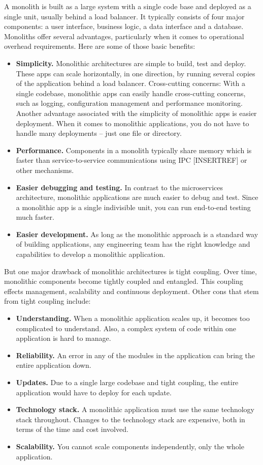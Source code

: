 A monolith is built as a large system with a single code base and deployed as a single unit, usually behind a load balancer.
It typically consists of four major components: a user interface, business logic, a data interface and a database.
Monoliths offer several advantages, particularly when it comes to operational overhead requirements.
Here are some of those basic benefits:

\begin{itemize}
    \item \textbf{Simplicity.} Monolithic architectures are simple to build, test and deploy.
    These apps can scale horizontally, in one direction, by running several copies of the application behind a load balancer.
    Cross-cutting concerns: With a single codebase, monolithic apps can easily handle cross-cutting concerns, such as logging,
    configuration management and performance monitoring.
    Another advantage associated with the simplicity of monolithic apps is easier deployment.
    When it comes to monolithic applications, you do not have to handle many deployments – just one file or directory.
    \item \textbf{Performance.} Components in a monolith typically share memory which is faster than service-to-service communications using
    IPC [INSERTREF] or other mechanisms.
    \item \textbf{Easier debugging and testing.}
    In contrast to the microservices architecture, monolithic applications are much easier to debug and test.
    Since a monolithic app is a single indivisible unit, you can run end-to-end testing much faster.
    \item \textbf{Easier development.} As long as the monolithic approach is a standard way of building applications,
    any engineering team has the right knowledge and capabilities to develop a monolithic application.
\end{itemize}
But one major drawback of monolithic architectures is tight coupling.
Over time, monolithic components become tightly coupled and entangled.
This coupling effects management, scalability and continuous deployment.
Other cons that stem from tight coupling include:

\begin{itemize}
    \item \textbf{Understanding.} When a monolithic application scales up, it becomes too complicated to understand.
    Also, a complex system of code within one application is hard to manage.
    \item \textbf{Reliability.} An error in any of the modules in the application can bring the entire application down.
    \item \textbf{Updates.} Due to a single large codebase and tight coupling, the entire application would have to deploy
    for each update.
    \item \textbf{Technology stack.} A monolithic application must use the same technology stack throughout.
    Changes to the technology stack are expensive, both in terms of the time and cost involved.
    \item \textbf{Scalability.} You cannot scale components independently, only the whole application.
\end{itemize}

